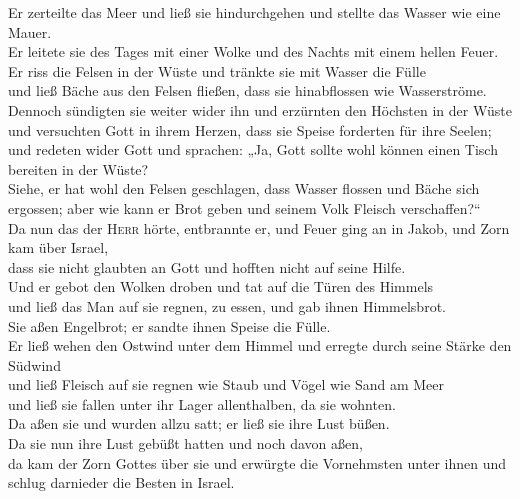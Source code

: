  Er zerteilte das Meer und ließ sie hindurchgehen und
stellte das Wasser wie eine Mauer.\\
 Er leitete sie des Tages mit einer Wolke und des Nachts
mit einem hellen Feuer.\\
 Er riss die Felsen in der Wüste und tränkte sie mit
Wasser die Fülle\\
 und ließ Bäche aus den Felsen fließen, dass sie
hinabflossen wie Wasserströme.\\
 Dennoch sündigten sie weiter wider ihn und erzürnten den
Höchsten in der Wüste\\
 und versuchten Gott in ihrem Herzen, dass sie Speise
forderten für ihre Seelen;\\
 und redeten wider Gott und sprachen: „Ja, Gott sollte
wohl können einen Tisch bereiten in der Wüste?\\
 Siehe, er hat wohl den Felsen geschlagen, dass Wasser
flossen und Bäche sich ergossen; aber wie kann er Brot geben und seinem
Volk Fleisch verschaffen?{}``\\
 Da nun das der \textsc{Herr} hörte, entbrannte er, und
Feuer ging an in Jakob, und Zorn kam über Israel,\\
 dass sie nicht glaubten an Gott und hofften nicht auf
seine Hilfe.\\
 Und er gebot den Wolken droben und tat auf die Türen des
Himmels\\
 und ließ das Man auf sie regnen, zu essen, und gab ihnen
Himmelsbrot.\\
 Sie aßen Engelbrot; er sandte ihnen Speise die Fülle.\\
 Er ließ wehen den Ostwind unter dem Himmel und erregte
durch seine Stärke den Südwind\\
 und ließ Fleisch auf sie regnen wie Staub und Vögel wie
Sand am Meer\\
 und ließ sie fallen unter ihr Lager allenthalben, da sie
wohnten.\\
 Da aßen sie und wurden allzu satt; er ließ sie ihre Lust
büßen.\\
 Da sie nun ihre Lust gebüßt hatten und noch davon
aßen,\\
 da kam der Zorn Gottes über sie und erwürgte die
Vornehmsten unter ihnen und schlug darnieder die Besten in Israel.\\
